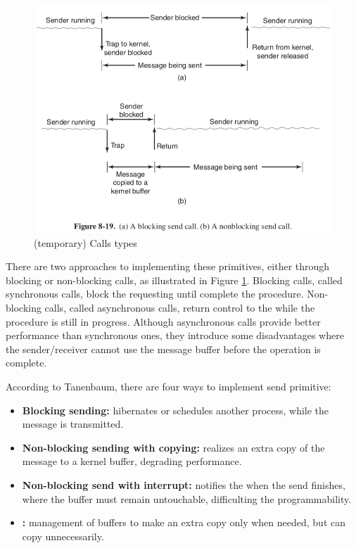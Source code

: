 				\begin{figure}[h]
					\centering
					\includegraphics[width=.8\textwidth]{images/calls-types.png}

					\caption{
						(temporary) Calls types
					}\par
					\label{fig::calls_types}
				\end{figure}

				There are two approaches to implementing these primitives, either
				through blocking or non-blocking calls, as illustrated in Figure \ref{fig::calls_types}.
				Blocking calls, called synchronous calls, block the requesting \cpu
				until complete the procedure.
				Non-blocking calls, called asynchronous calls, return control to the
				\cpu while the procedure is still in progress.
				Although asynchronous calls provide better performance than
				synchronous ones, they introduce some disadvantages where the sender/receiver
				cannot use the message buffer before the operation is complete.

				According to Tanenbaum, there are four ways to implement send primitive:
				\begin{itemize}
					\item \textbf{Blocking sending:} \cpu hibernates or schedules another
						process, while the message is transmitted.
					\item \textbf{Non-blocking sending with copying:} realizes an extra copy of
						the message to a kernel buffer, degrading performance.
					\item \textbf{Non-blocking send with interrupt:} notifies the \cpu
						when the send finishes, where the buffer must remain untouchable,
						difficulting the programmability.
					\item \textbf{\cow:} management of buffers to make an extra copy only
						when needed, but can copy unnecessarily.
				\end{itemize}

